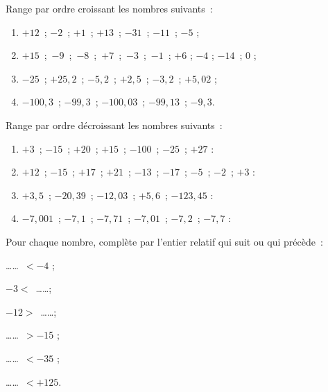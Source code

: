  
\begin{exercice}[Rangements]
Range par ordre croissant les nombres suivants :
\begin{enumerate}
 \item $+12$ ; $-2$ ; $+1$ ; $+13$ ; $-31$ ; $-11$ ; $-5$ ;
 \item $+15$ ; $-9$ ; $-8$ ; $+7$ ; $-3$ ; $-1$ ; $+6$ ;  $-4$ ; $-14$ ; $0$ ;
 \item $-25$ ; $+25,2$ ; $-5,2$ ; $+2,5$ ; $-3,2$ ; $+5,02$ ;
 \item $-100,3$ ; $-99,3$ ; $-100,03$ ; $-99,13$ ; $-9,3$.
 \end{enumerate}
\end{exercice}
        
    
\begin{exercice}
Range par ordre décroissant les nombres suivants :
\begin{enumerate}
 \item $+3$ ; $-15$ ; $+20$ ; $+15$ ; $-100$ ; $-25$ ; $+27$ :

 \dotfill
 
 \dotfill	
	
 \item $+12$ ; $-15$ ; $+17$ ; $+21$ ; $-13$ ; $-17$ ; $-5$ ; $-2$ ; $+3$ :
 
 \dotfill

 \dotfill	
	
 \item $+3,5$ ; $-20,39$ ; $-12,03$ ; $+5,6$ ; $-123,45$ :

 \dotfill
 
 \dotfill	
	
 \item $-7,001$ ; $-7,1$ ; $-7,71$ ; $-7,01$ ; $-7,2$ ; $-7,7$ :
 
 \dotfill
  
 \dotfill
 \end{enumerate}	
\end{exercice}


\begin{exercice}
Pour chaque nombre, complète par l'entier relatif qui suit ou qui précède :
\begin{colenumerate}{2}
 \item \ldots \ldots $< -4$ ;
 \item $-3 <$ \ldots \ldots ;
 \item $-12 >$ \ldots \ldots ;
 \item \ldots \ldots $> -15$ ;
 \item \ldots \ldots $< -35$ ;
 \item \ldots \ldots $< +125$. 
 \end{colenumerate}	
\end{exercice}


